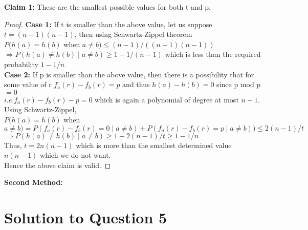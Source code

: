 \documentclass[11pt]{article}
\begin{document}
\textbf{Claim 1:} These are the smallest possible values for both t and p. 
\begin{proof}
	\textbf{Case 1:} If t is smaller than the above value, let us suppose $t = (n-1)(n-1)$, then using Schwartz-Zippel theorem \\
	$P(h(a) = h(b)$ when $a \neq b) \leq (n-1)/((n-1)(n-1))$ \\
	$\Rightarrow P(h(a) \neq h(b) \mid a \neq b) \geq 1 - 1/(n-1)$  which is less than the required probability $1 - 1/n$ \\
	\textbf{Case 2:} If p is smaller than the above value, then there is a possibility that for some value of r 
	$f_a(r) - f_b(r) = p$ and thus $h(a) - h(b) = 0$ since p mod p $= 0$\\
	$i.e. f_a(r) - f_b(r) - p = 0$ which is again a polynomial of degree at most $n-1$. Using Schwartz-Zippel, \\
	$P(h(a) = h(b)$ when $a \neq b) = P(f_a(r) - f_b(r) = 0 \mid a \neq b) + P(f_a(r) - f_b(r) = p \mid a \neq b)) \leq 2(n-1)/t$
	$\Rightarrow P(h(a) \neq h(b) \mid a \neq b) \geq 1 - 2(n-1)/t \geq 1 - 1/n$ \\
	Thus, $t = 2n(n-1)$ which is more than  the smallest determined value $n(n-1)$ which we do not want. \\
	Hence the above claim is valid.
\end{proof}

\textbf{Second Method:}

\section{Solution to Question 5}
\end{document}
